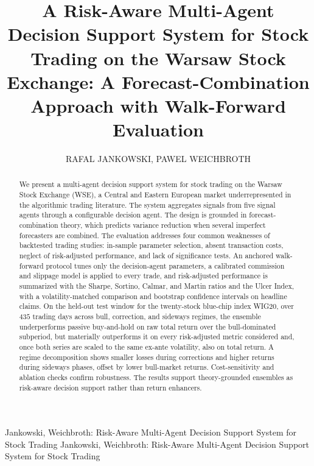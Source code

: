 \documentclass{ieeeaccess}
\newcommand{\OOSDays}{\ensuremath{435}}
\begin{document}

\title{A Risk-Aware Multi-Agent Decision Support System for Stock Trading on the Warsaw Stock Exchange: A Forecast-Combination Approach with Walk-Forward Evaluation}

\author{\uppercase{Rafal Jankowski},
\uppercase{Pawel Weichbroth}}

\address[1]{Faculty of Electronics, Telecommunications, and Informatics, Gdańsk University of Technology, 80-233 Gdańsk, Poland}
\address[2]{Faculty of Electronics, Telecommunications, and Informatics, Gdańsk University of Technology, 80-233 Gdańsk, Poland}


\markboth
{Jankowski, Weichbroth: Risk-Aware Multi-Agent Decision Support System for Stock Trading}
{Jankowski, Weichbroth: Risk-Aware Multi-Agent Decision Support System for Stock Trading}


\begin{abstract}
We present a multi-agent decision support system for stock trading on the Warsaw Stock Exchange (WSE), a Central and Eastern European market underrepresented in the algorithmic trading literature. The system aggregates signals from five signal agents through a configurable decision agent. The design is grounded in forecast-combination theory, which predicts variance reduction when several imperfect forecasters are combined. The evaluation addresses four common weaknesses of backtested trading studies: in-sample parameter selection, absent transaction costs, neglect of risk-adjusted performance, and lack of significance tests. An anchored walk-forward protocol tunes only the decision-agent parameters, a calibrated commission and slippage model is applied to every trade, and risk-adjusted performance is summarized with the Sharpe, Sortino, Calmar, and Martin ratios and the Ulcer Index, with a volatility-matched comparison and bootstrap confidence intervals on headline claims. On the held-out test window for the twenty-stock blue-chip index WIG20, over \OOSDays{} trading days across bull, correction, and sideways regimes, the ensemble underperforms passive buy-and-hold on raw total return over the bull-dominated subperiod, but materially outperforms it on every risk-adjusted metric considered and, once both series are scaled to the same ex-ante volatility, also on total return. A regime decomposition shows smaller losses during corrections and higher returns during sideways phases, offset by lower bull-market returns. Cost-sensitivity and ablation checks confirm robustness. The results support theory-grounded ensembles as risk-aware decision support rather than return enhancers.
\end{abstract}
\end{document}
